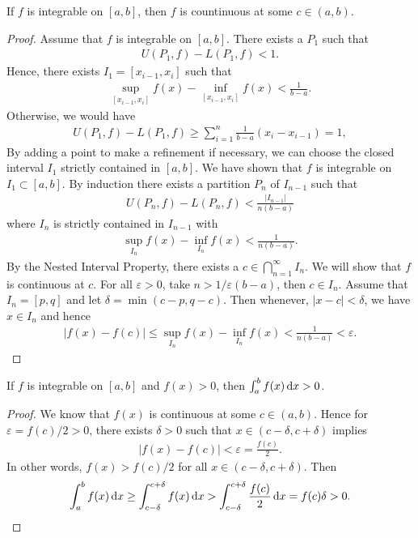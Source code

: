 \begin{theorem}
    If $f$ is integrable on $[a,b]$, then $f$ is countinuous at some $c\in (a,b)$.
\end{theorem}
\begin{proof}
    Assume that $f$ is integrable on $[a,b]$. There exists a $P_1$ such that
    \begin{align*}
        U(P_1,f) - L(P_1,f) < 1.
    \end{align*}
    Hence, there exists $I_1=[x_{i-1}, x_i]$ such that
    \begin{align*}
        \sup_{[x_{i-1}, x_i]} f(x) - \inf_{[x_{i-1}, x_i]} f(x) < \frac{1}{b-a}.
    \end{align*}
    Otherwise, we would have
    \begin{align*}
        U(P_1, f) - L(P_1, f) \ge \sum_{i=1}^n \frac{1}{b-a}(x_i - x_{i-1}) = 1,
    \end{align*}
    By adding a point to make a refinement if necessary, we can choose the closed interval $I_1$ strictly contained in $[a,b]$. We have shown that $f$ is integrable on $I_1\subset [a,b]$.
    By induction there exists a partition $P_n$ of $I_{n-1}$ such that
    \begin{align*}
        U(P_n, f) - L(P_n, f) < \frac{|I_{n-1}|}{n(b-a)}
    \end{align*}
    where $I_n$ is strictly contained in $I_{n-1}$ with
    \begin{align*}
        \sup_{I_n} f(x) - \inf_{I_n} f(x) < \frac{1}{n(b-a)}.
    \end{align*}
    By the Nested Interval Property, there exists a $c\in\bigcap_{n=1}^{\infty} I_n$. We will show that $f$ is continuous at $c$. For all $\varepsilon>0$, take $n>1/\varepsilon(b-a)$, then $c\in I_n$. Assume that $I_n = [p,q]$ and let $\delta = \min(c-p, q-c)$. Then whenever, $|x-c|<\delta$, we have $x\in I_n$ and hence
    \begin{align*}
        |f(x) - f(c)| \le \sup_{I_n} f(x) - \inf_{I_n} f(x) < \frac{1}{n(b-a)} < \varepsilon.
    \end{align*}
\end{proof}

\begin{corollary}
    If $f$ is integrable on $[a,b]$ and $f(x)>0$, then $\int_{a}^{b} f(x) \operatorname*{d\!} x > 0$.
\end{corollary}
\begin{proof}
    We know that $f(x)$ is continuous at some $c\in(a,b)$. Hence for $\varepsilon=f(c)/2 > 0$, there exists $\delta>0$ such that $x\in(c-\delta, c+\delta)$ implies
    \begin{align*}
        |f(x)-f(c)| < \varepsilon = \frac{f(c)}{2}.
    \end{align*}
    In other words, $f(x) > f(c)/2$ for all $x\in(c-\delta, c+\delta)$.
    Then
    \begin{align*}
        \int_{a}^{b} f(x) \operatorname*{d\!} x \ge \int_{c-\delta}^{c+\delta} f(x) \operatorname*{d\!} x > \int_{c-\delta}^{c+\delta} \frac{f(c)}{2} \operatorname*{d\!} x = f(c)\delta > 0.
    \end{align*}
\end{proof}

